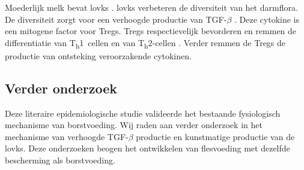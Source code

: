 \documentclass[abstract=true]{scrartcl}
\begin{document}
Moederlijk melk bevat \glspl{lovk} \cite{das2002essential}. \Glspl{lovk} verbeteren de diversiteit van het darmflora. De diversiteit zorgt voor een verhoogde productie van TGF-$\beta$ \cite{das2002essential,Das_2004}. Deze cytokine is een mitogene factor voor Tregs. Tregs respectievelijk bevorderen en remmen de differentiatie van T\textsubscript{h}1~cellen en van T\textsubscript{h}2-cellen \cite{penttila2010milk}. Verder remmen de Tregs de productie van ontsteking veroorzakende cytokinen. 

\subsection{Verder onderzoek}
Deze literaire epidemiologische studie valideerde het bestaande fysiologisch mechanisme van borstvoeding. Wij raden aan verder onderzoek in het mechanisme van verhoogde TGF-$\beta$ productie en kunstmatige productie van de \glspl{lovk}. Deze onderzoeken beogen het ontwikkelen van flesvoeding met dezelfde bescherming als borstvoeding.

\printglossaries
\printbibliography 
\end{document}

